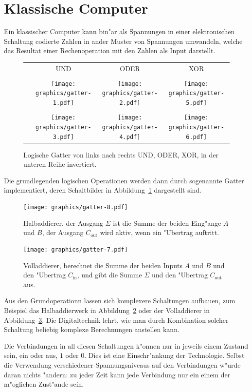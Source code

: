 \section{Klassische Computer}
Ein klassischer Computer kann bin"ar als Spannungen in einer
elektronischen Schaltung codierte Zahlen in ander Muster von
Spannungen umwandeln, welche das Resultat einer Rechenoperation
mit den Zahlen als Input darstellt.
\begin{figure}
\centering
\begin{tabular}{cccc}
&UND&ODER&XOR\\
\\
&
\texttt{[image: graphics/gatter-1.pdf]}&%
\texttt{[image: graphics/gatter-2.pdf]}&%
\texttt{[image: graphics/gatter-5.pdf]}
\\
\\
&
\texttt{[image: graphics/gatter-3.pdf]}&%
\texttt{[image: graphics/gatter-4.pdf]}&%
\texttt{[image: graphics/gatter-6.pdf]}
\end{tabular}
\caption{Logische Gatter von links nach rechts UND, ODER, XOR,
in der unteren Reihe invertiert.
\label{skript:gates}}
\end{figure}
Die grundlegenden logischen Operationen werden dann durch sogenannte
Gatter implementiert, deren Schaltbilder in Abbildung~\ref{skript:gates} dargestellt
sind.
\begin{figure}
\centering
\texttt{[image: graphics/gatter-8.pdf]}
\caption{Halbaddierer, der Ausgang $\Sigma$ ist die Summe der beiden
Eing"ange $A$ und $B$, der Ausgang $C_\text{out}$ wird aktiv, wenn
ein "Ubertrag auftritt.
\label{skript:halfadder}}
\end{figure}
\begin{figure}
\centering
\texttt{[image: graphics/gatter-7.pdf]}
\caption{Volladdierer, berechnet die Summe der beiden Inputs $A$ und $B$
und den "Ubertrag $C_\text{in}$, und gibt die Summe $\Sigma$ und den
"Ubertrag $C_\text{out}$ aus.
\label{skript:fulladder}}
\end{figure}
Aus den Grundoperationn lassen sich komplexere Schaltungen 
aufbauen, zum Beispiel das Halbaddierwerk in Abbildung~\ref{skript:halfadder}
oder der Volladdierer in Abbildung~\ref{skript:fulladder}.
Die Digitaltechnik lehrt, wie man durch Kombination solcher Schaltung
beliebig komplexe Berechnungen anstellen kann.

Die Verbindungen in all diesen Schaltungen k"onnen nur in jeweils einem
Zustand sein, ein oder aus, $1$ oder $0$.
Dies ist eine Einschr"ankung der Technologie.
Selbst die Verwendung verschiedener Spannungsniveaus auf den Verbindungen
w"urde daran nichts "andern: zu jeder Zeit kann jede Verbindung nur
ein einem der m"oglichen Zust"ande sein.

